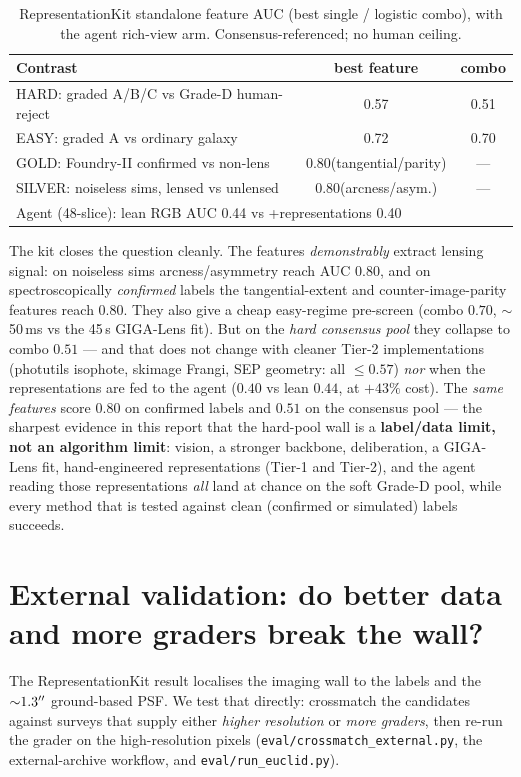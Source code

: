\documentclass[11pt,letterpaper]{article}
\newcommand{\reprEasy}{0.70}         %
\newcommand{\reprHard}{0.51}         %
\newcommand{\reprGold}{0.80}         %
\newcommand{\reprSilver}{0.80}       %
\newcommand{\reprAgentLean}{0.44}    %
\newcommand{\reprAgentRich}{0.40}    %
\begin{document}
\begin{table}[h]\centering
\caption{RepresentationKit standalone feature AUC (best single / logistic combo), with the
agent rich-view arm. Consensus-referenced; no human ceiling.}
\label{tab:repr}
\begin{tabular}{lcc}
\hline
Contrast & best feature & combo \\
\hline
HARD: graded A/B/C vs Grade-D human-reject & 0.57 & \reprHard \\
EASY: graded A vs ordinary galaxy          & 0.72 & \reprEasy \\
GOLD: Foundry-II confirmed vs non-lens     & \reprGold (tangential/parity) & --- \\
SILVER: noiseless sims, lensed vs unlensed & \reprSilver (arcness/asym.) & --- \\
\hline
\multicolumn{3}{l}{Agent (48-slice): lean RGB AUC \reprAgentLean{} vs +representations \reprAgentRich{}}\\
\hline
\end{tabular}
\end{table}

The kit closes the question cleanly. The features \emph{demonstrably} extract lensing signal:
on noiseless sims arcness/asymmetry reach AUC $\reprSilver$, and on spectroscopically
\emph{confirmed} labels the tangential-extent and counter-image-parity features reach
$\reprGold$. They also give a cheap easy-regime pre-screen (combo $\reprEasy$, $\sim$50\,ms vs
the 45\,s GIGA-Lens fit). But on the \emph{hard consensus pool} they collapse to combo
$\reprHard$ --- and that does not change with cleaner Tier-2 implementations (photutils
isophote, skimage Frangi, SEP geometry: all $\le0.57$) \emph{nor} when the representations are
fed to the agent ($\reprAgentRich$ vs lean $\reprAgentLean$, at $+43\%$ cost). The \emph{same
features} score $\reprGold$ on confirmed labels and $\reprHard$ on the consensus pool --- the
sharpest evidence in this report that the hard-pool wall is a \textbf{label/data limit, not an
algorithm limit}: vision, a stronger backbone, deliberation, a GIGA-Lens fit, hand-engineered
representations (Tier-1 and Tier-2), and the agent reading those representations \emph{all}
land at chance on the soft Grade-D pool, while every method that is tested against clean
(confirmed or simulated) labels succeeds.

\section{External validation: do better data and more graders break the wall?}
\label{sec:external}
The RepresentationKit result localises the imaging wall to the labels and the ${\sim}1.3^{\prime\prime}$
ground-based PSF. We test that directly: crossmatch the candidates against surveys that supply
either \emph{higher resolution} or \emph{more graders}, then re-run the grader on the
high-resolution pixels (\texttt{eval/crossmatch\_external.py}, the external-archive workflow, and
\texttt{eval/run\_euclid.py}).
\end{document}
